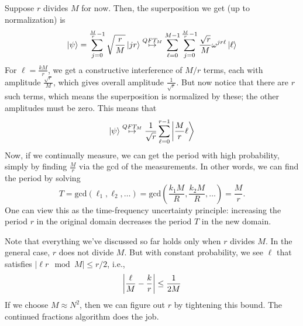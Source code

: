 Suppose $r$ divides $M$ for now. Then, the superposition we get (up to normalization) is
\[ \ket{\psi} = \sum_{j = 0}^{\frac{M}{r} - 1} \sqrt{\frac{r}{M}}\ket{jr} \overset{QFT_M}{\mapsto} \sum_{\ell = 0}^{M - 1} \sum_{j = 0}^{\frac{M}{r} - 1} \frac{\sqrt{r}}{M} \omega^{jr\ell} \ket{\ell} \]
For $\ell = \frac{k M}{r}$, we get a constructive interference of $M/r$ terms, each with amplitude $\frac{\sqrt{r}}{M}$, which gives overall amplitude
$\frac{1}{\sqrt{r}}$. But now notice that there are $r$ such terms, which means the superposition is normalized by these; the other amplitudes must be zero.
This means that 
\[ \ket{\psi} \overset{QFT_M}{\mapsto} \frac{1}{\sqrt{r}} \sum_{\ell = 0}^{r - 1} \ket{\frac{M}{r}\ell}\]
Now, if we continually measure, we can get the period with high probability, simply by finding $\frac{M}{r}$ via the gcd of the measurements. %
In other words, we can find the period by solving
\[T = \mathrm{gcd}\left(\ell_1, \ell_2, \dots\right) = \mathrm{gcd} \left(\frac{k_1 M}{R}, \frac{k_2 M}{R}, \dots\right) = \frac{M}{r}.\]
One can view this as the time-frequency uncertainty principle: increasing the period $r$ in the original domain decreases the period $T$ in the new domain.

Note that everything we've discussed so far holds only when $r$ divides $M$. In the general case, $r$ does not divide $M$. But with constant probability, we see $\ell$ that satisfies $|\ell r \mod M| \leq r/2$, i.e.,
\[ \qty|\frac{\ell}{M} - \frac{k}{r}| \leq \frac{1}{2M} \]
If we choose $M \approx N^2$, then we can figure out $r$ by tightening this bound. The continued fractions algorithm does the job.